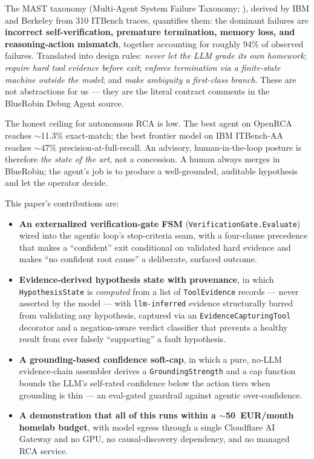 \documentclass[11pt]{article}
\begin{document}
The MAST taxonomy (Multi-Agent System Failure Taxonomy;
\citealp{cemri2025mast}), derived by IBM and Berkeley from 310 ITBench traces,
quantifies them: the dominant failures are \textbf{incorrect self-verification,
premature termination, memory loss, and reasoning-action mismatch}, together
accounting for roughly 94\% of observed failures. Translated into design
rules: \emph{never let the LLM grade its own homework}; \emph{require hard tool
evidence before exit}; \emph{enforce termination via a finite-state machine
outside the model}; and \emph{make ambiguity a first-class branch}. These are
not abstractions for us --- they are the literal contract comments in the
BlueRobin Debug Agent source.

The honest ceiling for autonomous RCA is low. The best agent on OpenRCA
\citep{xu2025openrca} reaches $\sim$11.3\% exact-match; the best frontier model
on IBM ITBench-AA \citep{itbenchaa2026} reaches $\sim$47\%
precision-at-full-recall. An advisory, human-in-the-loop posture is therefore
\emph{the state of the art}, not a concession. A human always merges in
BlueRobin; the agent's job is to produce a well-grounded, auditable hypothesis
and let the operator decide.

This paper's contributions are:
\begin{itemize}
  \item \textbf{An externalized verification-gate FSM}
  (\texttt{VerificationGate.Evaluate}) wired into the agentic loop's
  stop-criteria seam, with a four-clause precedence that makes a ``confident''
  exit conditional on validated hard evidence and makes ``no confident root
  cause'' a deliberate, surfaced outcome.
  \item \textbf{Evidence-derived hypothesis state with provenance}, in which
  \texttt{HypothesisState} is \emph{computed} from a list of
  \texttt{ToolEvidence} records --- never asserted by the model --- with
  \texttt{llm-inferred} evidence structurally barred from validating any
  hypothesis, captured via an \texttt{EvidenceCapturingTool} decorator and a
  negation-aware verdict classifier that prevents a healthy result from ever
  falsely ``supporting'' a fault hypothesis.
  \item \textbf{A grounding-based confidence soft-cap}, in which a pure,
  no-LLM evidence-chain assembler derives a \texttt{GroundingStrength} and a
  cap function bounds the LLM's self-rated confidence below the action tiers
  when grounding is thin --- an eval-gated guardrail against agentic
  over-confidence.
  \item \textbf{A demonstration that all of this runs within a
  $\sim$50~EUR/month homelab budget}, with model egress through a single
  Cloudflare AI Gateway and no GPU, no causal-discovery dependency, and no
  managed RCA service.
\end{itemize}
\end{document}
